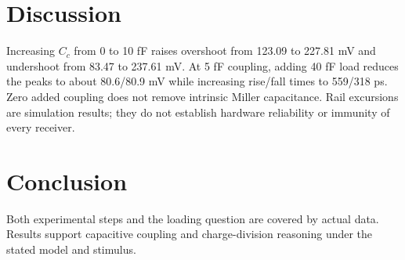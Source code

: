 \section{Discussion}
Increasing $C_c$ from 0 to 10 fF raises overshoot from 123.09 to 227.81 mV and undershoot from 83.47 to 237.61 mV. At 5 fF coupling, adding 40 fF load reduces the peaks to about 80.6/80.9 mV while increasing rise/fall times to 559/318 ps. Zero added coupling does not remove intrinsic Miller capacitance. Rail excursions are simulation results; they do not establish hardware reliability or immunity of every receiver.

\section{Conclusion}
Both experimental steps and the loading question are covered by actual data. Results support capacitive coupling and charge-division reasoning under the stated model and stimulus.
